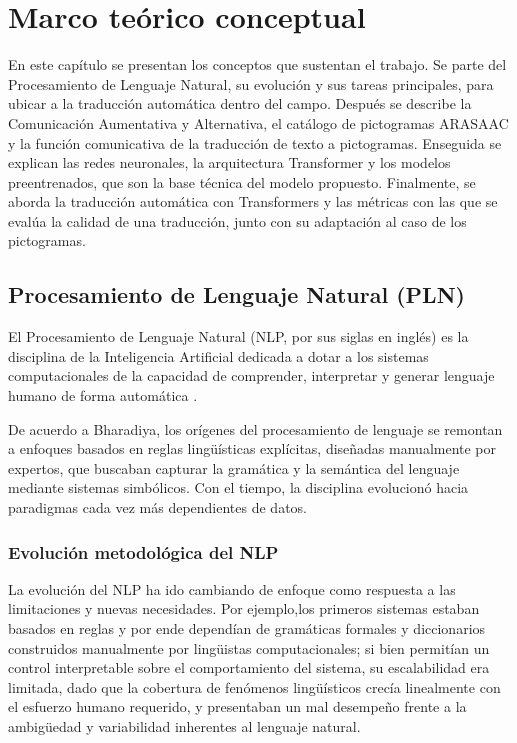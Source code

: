 \section{Marco teórico conceptual}
\label{sec:marco-teorico}

En este capítulo se presentan los conceptos que sustentan el trabajo. Se parte del Procesamiento de Lenguaje Natural, su evolución y sus tareas principales, para ubicar a la traducción automática dentro del campo. Después se describe la Comunicación Aumentativa y Alternativa, el catálogo de pictogramas ARASAAC y la función comunicativa de la traducción de texto a pictogramas. Enseguida se explican las redes neuronales, la arquitectura Transformer y los modelos preentrenados, que son la base técnica del modelo propuesto. Finalmente, se aborda la traducción automática con Transformers y las métricas con las que se evalúa la calidad de una traducción, junto con su adaptación al caso de los pictogramas.

\subsection{Procesamiento de Lenguaje Natural (PLN)}
El Procesamiento de Lenguaje Natural (NLP, por sus siglas en inglés) es la disciplina de la Inteligencia Artificial dedicada a dotar a los sistemas computacionales de la capacidad de comprender, interpretar y generar lenguaje humano de forma automática \cite{bharadiya2023nlp}. 

    De acuerdo a Bharadiya\cite{bharadiya2023nlp}, los orígenes del procesamiento de lenguaje se remontan a enfoques basados en reglas lingüísticas explícitas, diseñadas manualmente por expertos, que buscaban capturar la gramática y la semántica del lenguaje mediante sistemas simbólicos. Con el tiempo, la disciplina evolucionó hacia paradigmas cada vez más dependientes de datos.

\subsubsection{Evolución metodológica del NLP}

La evolución del NLP ha ido cambiando de enfoque como respuesta a las limitaciones y nuevas necesidades. Por ejemplo,los primeros sistemas estaban basados en reglas y por ende dependían de gramáticas formales y diccionarios construidos manualmente por lingüistas computacionales; si bien permitían un control interpretable sobre el comportamiento del sistema, su escalabilidad era limitada, dado que la cobertura de fenómenos lingüísticos crecía linealmente con el esfuerzo humano requerido, y presentaban un mal desempeño frente a la ambigüedad y variabilidad inherentes al lenguaje natural.

